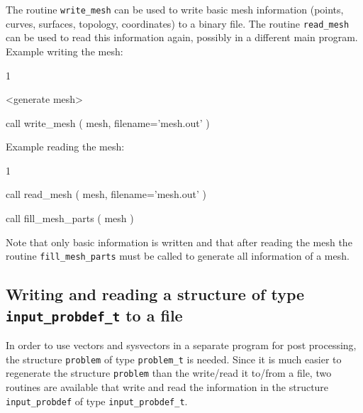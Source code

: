 The routine \texttt{write\_mesh} can be used to write
basic mesh information (points, curves, surfaces, topology, coordinates)
to a binary file.
The routine \texttt{read\_mesh} can be used to read this information again,
possibly in a different main program.\\
Example writing the mesh:
\begin{listing}{1}

  <generate mesh>

  call write_mesh ( mesh, filename='mesh.out' )

\end{listing}
Example reading the mesh:
\begin{listing}{1}

  call read_mesh ( mesh, filename='mesh.out' )

  call fill_mesh_parts ( mesh )

\end{listing}
Note that only basic information is written and that after reading the mesh the
routine \texttt{fill\_mesh\_parts} must be called to generate all information of
a mesh.

\subsection{Writing and reading a structure of type
     \texttt{input\_probdef\_t} to a file}

In order to use vectors and sysvectors in a separate program for
post processing, the structure \texttt{problem} of type \texttt{problem\_t}
is needed. Since it is much easier to regenerate the structure
\texttt{problem} than the write/read it to/from a file, two routines
are available that write and read the information in the structure
\texttt{input\_probdef} of type \texttt{input\_probdef\_t}.

